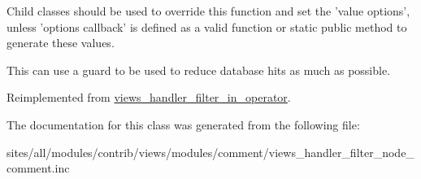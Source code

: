 Child classes should be used to override this function and set the 'value options', unless 'options callback' is defined as a valid function or static public method to generate these values.

This can use a guard to be used to reduce database hits as much as possible. 

Reimplemented from \hyperlink{classviews__handler__filter__in__operator_a5b5df6d90f4359ed28c0c446bdc81a6}{views\_\-handler\_\-filter\_\-in\_\-operator}.

The documentation for this class was generated from the following file:\begin{CompactItemize}
\item 
sites/all/modules/contrib/views/modules/comment/views\_\-handler\_\-filter\_\-node\_\-comment.inc\end{CompactItemize}

